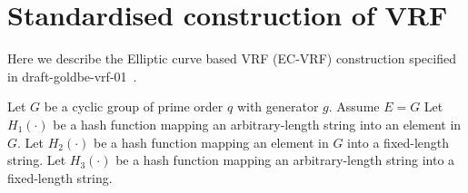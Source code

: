 \section{Standardised construction of VRF}
\label{vrf_standardised_construction}

Here we describe the Elliptic curve based VRF (EC-VRF) construction specified in draft-goldbe-vrf-01~\cite{goldberg2017draft}.

Let $G$ be a cyclic group of prime order $q$ with generator $g$. Assume $E = G$
Let $H_1(\cdot)$ be a hash function mapping an arbitrary-length string into an element in $G$.
Let $H_2(\cdot)$ be a hash function mapping an element in $G$ into a fixed-length string.
Let $H_3(\cdot)$ be a hash function mapping an arbitrary-length string into a fixed-length string.

\noindent{}

